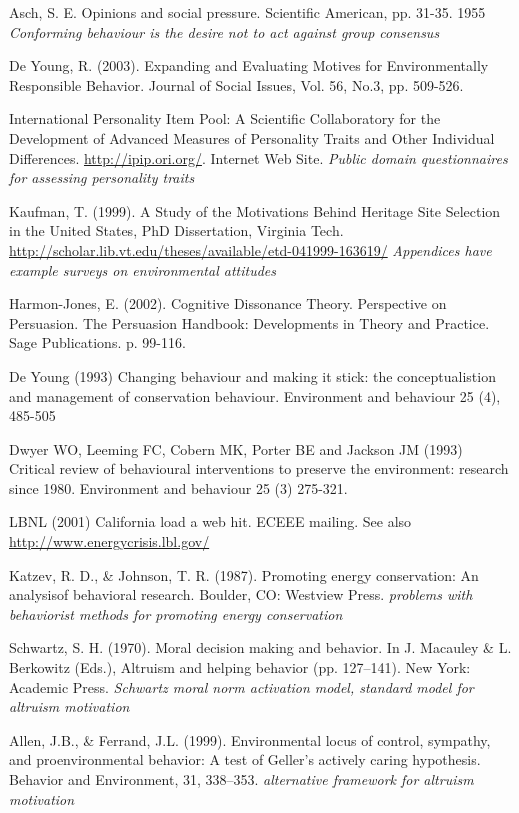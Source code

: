 Asch, S. E. Opinions and social pressure. Scientiﬁc American, pp. 31-35. 1955 \emph{Conforming behaviour is the desire not to act against group consensus}

De Young, R. (2003). Expanding and Evaluating Motives for Environmentally Responsible Behavior. Journal of Social Issues, Vol. 56, No.3, pp. 509-526.

International Personality Item Pool: A Scientific Collaboratory for the Development of Advanced Measures of Personality Traits and Other Individual Differences. \url{http://ipip.ori.org/}. Internet Web Site. \emph{Public domain questionnaires for assessing personality traits}

Kaufman, T. (1999). A Study of the Motivations Behind Heritage Site Selection in the United States, PhD Dissertation, Virginia Tech. \url{http://scholar.lib.vt.edu/theses/available/etd-041999-163619/} \emph{Appendices have example surveys on environmental attitudes}

Harmon-Jones, E. (2002). Cognitive Dissonance Theory. Perspective on Persuasion. The Persuasion Handbook:  Developments in Theory and Practice. Sage Publications. p. 99-116.

De Young (1993) Changing behaviour and making it stick: the conceptualistion and management of conservation behaviour. Environment and behaviour 25 (4), 485-505 

Dwyer WO, Leeming FC, Cobern MK, Porter BE and Jackson JM (1993) Critical review of behavioural interventions to preserve the environment: research since 1980. Environment and behaviour 25 (3) 275-321.

LBNL (2001) California load a web hit. ECEEE mailing. See also \url{http://www.energycrisis.lbl.gov/}

Katzev, R. D., \& Johnson, T. R. (1987). Promoting energy conservation: An analysisof behavioral research. Boulder, CO: Westview Press. \emph{problems with behaviorist methods for promoting energy conservation}

Schwartz, S. H. (1970). Moral decision making and behavior. In J. Macauley \& L. Berkowitz (Eds.), Altruism and helping behavior (pp. 127–141). New York: Academic Press. \emph{Schwartz moral norm activation model, standard model for altruism motivation}

Allen, J.B., \& Ferrand, J.L. (1999). Environmental locus of control, sympathy, and proenvironmental behavior: A test of Geller’s actively caring hypothesis. Behavior and Environment, 31, 338–353. \emph{alternative framework for altruism motivation}

